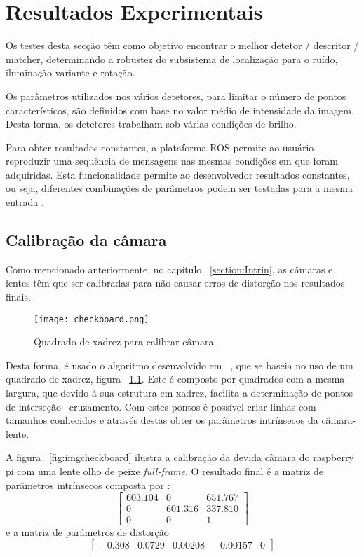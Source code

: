 \chapter{Resultados Experimentais} \label{chap:resexp}


Os testes desta secção têm como objetivo encontrar o melhor detetor / descritor / matcher, determinando a robustez do subsistema de localização para o ruído, iluminação variante e rotação.

Os parâmetros utilizados nos vários detetores, para limitar o número de pontos característicos, são definidos com base no valor médio de intensidade da imagem. Desta forma, os detetores trabalham sob várias condições de brilho.

Para obter resultados constantes, a plataforma ROS permite ao usuário reproduzir uma sequência de mensagens nas mesmas condições em que foram adquiridas. Esta funcionalidade permite ao desenvolvedor resultados constantes, ou seja, diferentes combinações de parâmetros podem ser testadas para a mesma entrada .

\section{Calibração da câmara}

Como mencionado anteriormente, no capítulo ~\ref{section:Intrin}, as câmaras e lentes têm que ser calibradas para não causar erros de distorção nos resultados finais. 

\begin{figure}[h!]  %
	\centering
	\texttt{[image: checkboard.png]} 
	\caption{Quadrado de xadrez para calibrar câmara.}
	\label{fig:checkboard}  %
\end{figure}

Desta forma, é usado o algoritmo desenvolvido em ~\cite{piCam}, que se baseia no uso de um quadrado de xadrez, figura ~\ref{fig:checkboard}. Este é composto por quadrados com a mesma largura, que devido á sua estrutura em  xadrez, facilita a determinação de pontos de interseção \ cruzamento. Com estes pontos é possível criar linhas com tamanhos conhecidos e através destas obter os parâmetros intrínsecos da câmara-lente. 



A figura ~\ref{fig:imgcheckboard} ilustra a calibração da devida câmara do raspberry pi com uma lente olho de peixe \textit{full-frame}. O resultado final é a matriz de parâmetros intrínsecos composta por : \[ \left[ \begin{array}{ccc}
603.104 & 0 & 651.767 \\ 
0 & 601.316 & 337.810 \\ 
0 & 0 & 1
\end{array} \right] \] e a matriz de parâmetros de distorção \[ \left[\begin{array}{ccccc}
-0.308 & 0.0729 & 0.00208 & -0.00157 & 0 
\end{array} \right] \]

